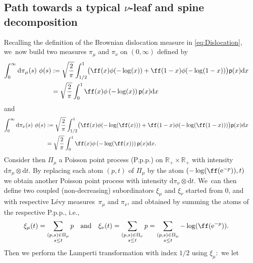 \documentclass[JEP,XML,SOM,Unicode,NoFloatCountersInSection, NoEqCountersInSection,published]{cedram}
\newcommand{\pp}{\mathsf{p}}
\newcommand{\dd}{\mathrm{d}}
\theoremstyle{definition}
\begin{document}
\subsection{Path towards a typical $\nu$-leaf and spine decomposition}
Recalling the definition of the Brownian dislocation measure in \eqref{eq:Dislocation}, we~now build two measures $\pi_\mu$ and $\pi_\nu$ on $(0,\infty)$ defined by
\begin{align*}
\int_{0}^{\infty} \mathrm{d} \pi_\mu(s) \ \phi(s) &:= \sqrt{\frac{2}{\pi}} \int_{1/2}^{1} \bigl(\ff(x) \phi(-\log (x)) + \ff(1-x) \phi(-\log (1-x))\bigr)\pp(x)\dd x \\
&= \sqrt{\frac{2}{\pi}} \int_0^{1} \ff(x) \phi\left(-\log (x)\right) \pp(x)\dd x
\end{align*}
and
\begin{align*} \int_{0}^{\infty} \mathrm{d} \pi_\nu(s) \ \phi(s) &:= \sqrt{\frac{2}{\pi}} \int_{1/2}^{1}\bigl(\ff(x) \phi(-\log (\ff(x))) + \ff(1-x) \phi(-\log (\ff(1-x)))\bigr)\pp(x)\dd x \\
&= \sqrt{\frac{2}{\pi}} \int_0^{1} \ff(x) \phi\left(-\log (\ff(x))\right)\pp(x)\dd x.
\end{align*}
Consider then $\Pi_\mu$ a Poisson point process (P.p.p.) on $ \mathbb{R}_+ \!\times\! \mathbb{R}_+$ with intensity \hbox{$ \mathrm{d} \pi_\mu \!\otimes\! \mathrm{d}t$}. By replacing each atom $(p,t)$ of $\Pi_\mu$ by the atom $(-\log(\ff (\mathrm{e}^{-p})),t)$ we obtain another Poisson point process with intensity $ \mathrm{d}\pi_\nu \otimes \mathrm{d}t$. We~can then define two coupled (non-decreasing) subordinators $\xi_\mu$ and $\xi_\nu$ started from $0$, and with respective Lévy measures~$\pi_\mu$ and $\pi_\nu$, and obtained by summing the atoms of the respective P.p.p., i.e.,
\begin{equation}\label{defxi}
\xi_\mu(t) = \sum_{\begin{subarray}{c}(p,s) \in \Pi_\mu \\ s \leq t\end{subarray}} p \quad \text{and} \quad \xi_\nu(t) = \sum_{\begin{subarray}{c}(p,s) \in \Pi_\nu \\ s \leq t
\end{subarray}} p = \sum_{\begin{subarray}{c}(p,s) \in \Pi_\mu \\ s \leq t\end{subarray}} -\log(\ff (\mathrm{e}^{-p})).\end{equation}
Then we perform the Lamperti transformation with index $1/2$ using $\xi_\mu:$ we let
\end{document}
